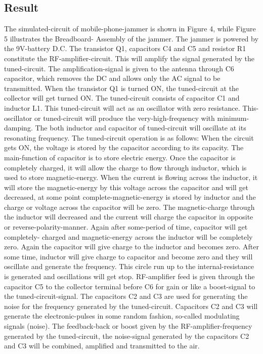 \documentclass{article}
\begin{document}
\subsection{Result}
The simulated-circuit of mobile-phone-jammer is shown in  Figure  4,  while Figure 5 illustrates the Breadboard- Assembly of the jammer.  The jammer is powered by the 9V-battery D.C. The transistor Q1,  capacitors C4 and C5 and resistor R1 constitute  the  RF-amplifier-circuit.  This  will  amplify  the  signal  generated  by  the  tuned-circuit.  The amplification-signal  is  given to  the  antenna  through  C6  capacitor,  which removes  the  DC and  allows only  the AC  signal  to  be transmitted.  When the  transistor  Q1  is  turned  ON,  the tuned-circuit  at the  collector  will  get turned ON. The tuned-circuit consists of capacitor C1 and inductor L1. This tuned-circuit will act as an oscillator with  zero  resistance.  This-oscillator  or  tuned-circuit  will  produce  the  very-high-frequency  with  minimum-damping. The both inductor and capacitor of tuned-circuit will oscillate at its resonating frequency.
The  tuned-circuit  operation  is  as  follows:  When  the  circuit  gets  ON,  the  voltage  is  stored  by  the capacitor according to its capacity. The main-function of capacitor is to store electric energy. Once the capacitor is completely charged, it will allow the charge to flow through inductor, which is used to store magnetic-energy. When  the  current  is  flowing  across  the inductor,  it will  store  the  magnetic-energy  by  this  voltage  across  the capacitor and will get decreased, at some point complete-magnetic-energy is stored by inductor and the charge or voltage  across  the  capacitor  will  be  zero.  The  magnetic-charge  through  the  inductor  will  decreased  and  the current  will  charge  the  capacitor  in  opposite  or  reverse-polarity-manner.  Again  after  some-period  of  time, capacitor will get  completely- charged  and  magnetic-energy across the  inductor  will be completely zero. Again the capacitor  will  give charge  to  the  inductor and becomes zero.  After  some  time,  inductor will give charge to capacitor and become zero and they will oscillate and generate the frequency. This circle run up  to the internal-resistance is  generated  and oscillations will get stop.  RF-amplifier  feed is given through the  capacitor C5 to the collector terminal before C6 for gain or like a boost-signal to the tuned-circuit-signal. The capacitors C2 and C3 are  used  for  generating the  noise for  the  frequency  generated by  the  tuned-circuit.  Capacitors C2  and C3  will generate the electronic-pulses in some random fashion, so-called  modulating signals (noise). The feedback-back or boost  given  by  the  RF-amplifier-frequency  generated  by  the tuned-circuit, the  noise-signal  generated by the capacitors C2 and C3 will be combined, amplified and transmitted to the air.
\end{document}
